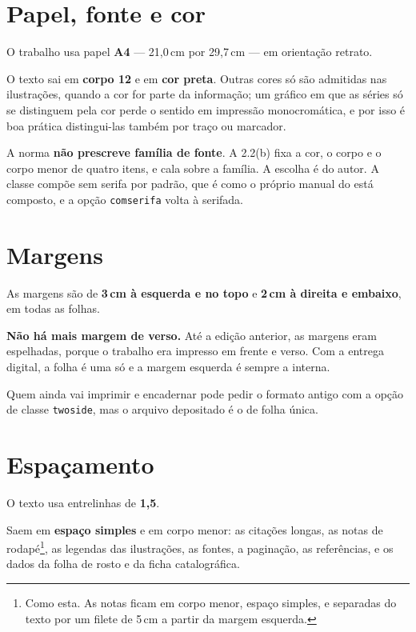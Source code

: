 \documentclass[dsc]{ufrj}
\begin{document}
  \section{Papel, fonte e cor}

  O trabalho usa papel \textbf{A4} --- 21{,}0\,cm por 29{,}7\,cm --- em
  orientação retrato.

  O texto sai em \textbf{corpo 12} e em \textbf{cor preta}. Outras cores só são
  admitidas nas ilustrações, quando a cor for parte da informação; um gráfico em
  que as séries só se distinguem pela cor perde o sentido em impressão
  monocromática, e por isso é boa prática distingui-las também por traço ou
  marcador.

  A norma \textbf{não prescreve família de fonte}. A 2.2(b) fixa a cor, o corpo
  e o corpo menor de quatro itens, e cala sobre a família. A escolha é do autor.
  A classe compõe sem serifa por padrão, que é como o próprio manual do
   está composto, e a opção \verb|comserifa| volta à serifada.

  \section{Margens}

  As margens são de \textbf{3\,cm à esquerda e no topo} e \textbf{2\,cm à
  direita e embaixo}, em todas as folhas.

  \textbf{Não há mais margem de verso.} Até a edição anterior, as margens eram
  espelhadas, porque o trabalho era impresso em frente e verso. Com a entrega
  digital, a folha é uma só e a margem esquerda é sempre a interna.

  Quem ainda vai imprimir e encadernar pode pedir o formato antigo com a opção
  de classe \verb|twoside|, mas o arquivo depositado é o de folha única.

  \section{Espaçamento}

  O texto usa entrelinhas de \textbf{1,5}.

  Saem em \textbf{espaço simples} e em corpo menor: as citações longas, as notas
  de rodapé\footnote{Como esta. As notas ficam em corpo menor, espaço simples, e
  separadas do texto por um filete de 5\,cm a partir da margem esquerda.}, as
  legendas das ilustrações, as fontes, a paginação, as referências, e os dados
  da folha de rosto e da ficha catalográfica.
\end{document}
